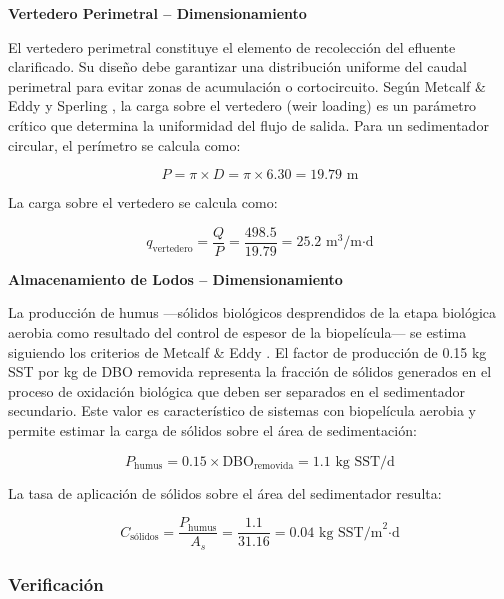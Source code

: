 \documentclass[12pt,a4paper]{article}
\begin{document}
\textbf{Vertedero Perimetral -- Dimensionamiento}

El vertedero perimetral constituye el elemento de recolección del efluente clarificado. Su diseño debe garantizar una distribución uniforme del caudal perimetral para evitar zonas de acumulación o cortocircuito. Según Metcalf \& Eddy \cite{metcalf2014} y Sperling \cite{sperling2007}, la carga sobre el vertedero (weir loading) es un parámetro crítico que determina la uniformidad del flujo de salida. Para un sedimentador circular, el perímetro se calcula como:

\begin{equation}
P = \pi \times D = \pi \times 6.30 = 19.79 \text{ m}
\end{equation}

La carga sobre el vertedero se calcula como:

\begin{equation}
q_{\text{vertedero}} = \frac{Q}{P} = \frac{498.5}{19.79} = 25.2 \text{ m}^3\text{/m·d}
\end{equation}

\textbf{Almacenamiento de Lodos -- Dimensionamiento}

La producción de humus —sólidos biológicos desprendidos de la etapa biológica aerobia como resultado del control de espesor de la biopelícula— se estima siguiendo los criterios de Metcalf \& Eddy \cite{metcalf2014}. El factor de producción de 0.15 kg SST por kg de DBO removida representa la fracción de sólidos generados en el proceso de oxidación biológica que deben ser separados en el sedimentador secundario. Este valor es característico de sistemas con biopelícula aerobia y permite estimar la carga de sólidos sobre el área de sedimentación:

\begin{equation}
P_{\text{humus}} = 0.15 \times \text{DBO}_{\text{removida}} = 1.1 \text{ kg SST/d}
\end{equation}

La tasa de aplicación de sólidos sobre el área del sedimentador resulta:

\begin{equation}
C_{\text{sólidos}} = \frac{P_{\text{humus}}}{A_s} = \frac{1.1}{31.16} = 0.04 \text{ kg SST/m}^2\text{·d}
\end{equation}

\subsubsection{Verificación}
\end{document}
